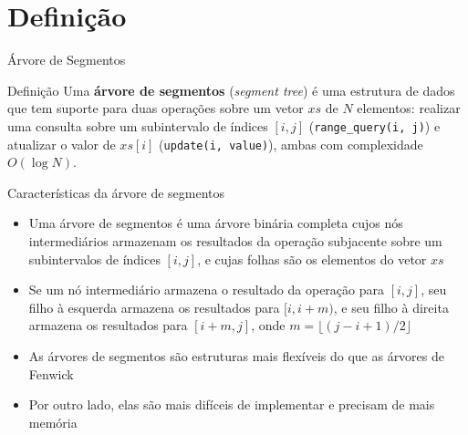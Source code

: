 \section{Definição}

\begin{frame}[fragile]{Árvore de Segmentos}

    \begin{block}{Definição}
        Uma \textbf{árvore de segmentos} (\textit{segment tree}) é uma estrutura de dados que
        tem suporte para duas operações sobre um vetor $xs$ de $N$ elementos: realizar uma consulta
        sobre um subintervalo de índices $[i, j]$ (\texttt{range\_query(i, j)}) e atualizar o valor 
        de $xs[i]$ (\texttt{update(i, value)}), ambas com complexidade $O(\log N)$.
    \end{block}

\end{frame}

\begin{frame}[fragile]{Características da árvore de segmentos}

    \begin{itemize}
        \item Uma árvore de segmentos é uma árvore binária completa cujos nós intermediários 
            armazenam
            os resultados da operação subjacente sobre um  subintervalos de índices $[i, j]$, e 
            cujas folhas são os elementos do vetor $xs$

        \item Se um nó intermediário armazena o resultado da operação para $[i, j]$, seu filho
            à esquerda armazena os resultados para $[i, i + m)$, e seu filho à direita armazena
            os resultados para $[i + m, j]$, onde $m = \lfloor (j - i + 1)/2 \rfloor$

        \item As árvores de segmentos são estruturas mais flexíveis do que as árvores de Fenwick

        \item Por outro lado, elas são mais difíceis de implementar e precisam de mais memória
    \end{itemize}

\end{frame}

